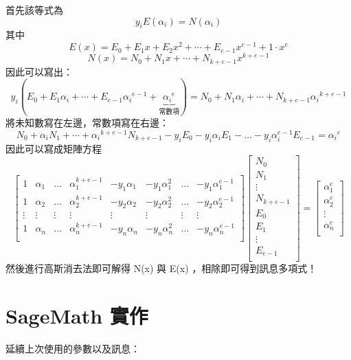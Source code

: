 \documentclass[
]{article}
\begin{document}
首先該等式為 \[
y_{i}E(\alpha_{i}) = N(\alpha_{i})
\] 其中 \[
E(x) = E_{0} +E_{1}x+E_{2}x^{2} +\cdots + E_{e-1}x^{e-1}+1\cdot x^e
\] \[
N(x) = N_0+N_{1}x+\cdots+N_{k+e-1}x^{k+e-1}
\] 因此可以寫出： \[
y_{i}
(E_{0} +E_{1}\alpha_{i} +\cdots + E_{e-1}{\alpha_{i}}^{e-1}+ \underbrace{ {\alpha_{i}}^e }_{ 常數項 })
= 
N_0+N_{1}\alpha_{i}+\cdots+N_{k+e-1}{\alpha_{i}}^{k+e-1}
\] 將未知數寫在左邊，常數項寫在右邊： \[
N_0+\alpha_{i}N_{1}+\cdots+{\alpha_{i}}^{k+e-1} N_{k+e-1}
-y_{i}E_{0}-y_{i}\alpha_{i}E_{1} - \dots-y_{i}\alpha_{i}^{e-1}E_{e-1}
={\alpha_{i}}^e
\] 因此可以寫成矩陣方程 \[
\begin{bmatrix}
1  & \alpha_{1}   & \dots & \alpha_{1}^{k+e-1} & -y_{1}\alpha_{1} & -y_{1}\alpha_{1}^{2}  & \dots & -y_{1}\alpha_{1}^{e-1} \\
1  & \alpha_{2}   & \dots & \alpha_{2}^{k+e-1} & -y_{2}\alpha_{2} & -y_{2}\alpha_{2}^{2}  & \dots & -y_{2}\alpha_{2}^{e-1} \\
\vdots  & \vdots  & \vdots  & \vdots  & \vdots  & \vdots  & \vdots  & \vdots     \\
1  & \alpha_{n}  & \dots & \alpha_{n}^{k+e-1} & -y_{n}\alpha_{n} & -y_{n}\alpha_{n}^{2}  & \dots & -y_{n}\alpha_{n}^{e-1} \\
\end{bmatrix}
\begin{bmatrix}
N_{0} \\
N_{1} \\
\vdots \\
N_{k+e-1} \\
E_{0} \\
E_{1} \\
\vdots \\
E_{e-1} \\
\end{bmatrix}
=\begin{bmatrix}
\alpha_{1}^{e} \\
\alpha_{2}^{e} \\
\vdots \\
\alpha_{n}^{e} \\
\end{bmatrix}
\] 然後進行高斯消去法即可解得 N(x) 與 E(x) ，相除即可得到訊息多項式！

\hypertarget{sagemath-ux5be6ux4f5c}{%
\section{SageMath 實作}\label{sagemath-ux5be6ux4f5c}}

延續上次使用的參數以及訊息：
\end{document}
